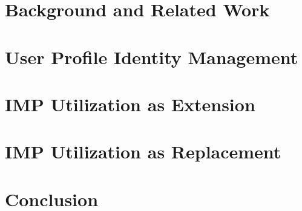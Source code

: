 \documentclass[
     12pt,         %
     a4paper,      %
     BCOR=10mm,version=first,     %
     DIV=14,version=first,        %
     ]{scrreprt}
\begin{document}
\chapter{Background and Related Work}


\chapter{User Profile Identity Management} \label{chapter:user_profile_identity_management}


\chapter{IMP Utilization as Extension}


\chapter{IMP Utilization as Replacement}


\chapter{Conclusion}


\printbibliography
\end{document}
